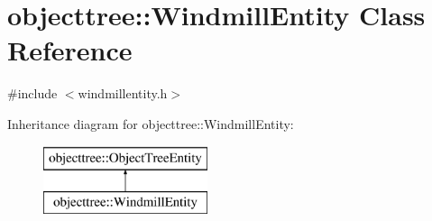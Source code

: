 \hypertarget{classobjecttree_1_1_windmill_entity}{}\section{objecttree\+::Windmill\+Entity Class Reference}
\label{classobjecttree_1_1_windmill_entity}


{\ttfamily \#include $<$windmillentity.\+h$>$}

Inheritance diagram for objecttree\+::Windmill\+Entity\+:\begin{figure}[H]
\begin{center}
\leavevmode
\includegraphics[height=2.000000cm]{d1/d13/classobjecttree_1_1_windmill_entity}
\end{center}
\end{figure}
